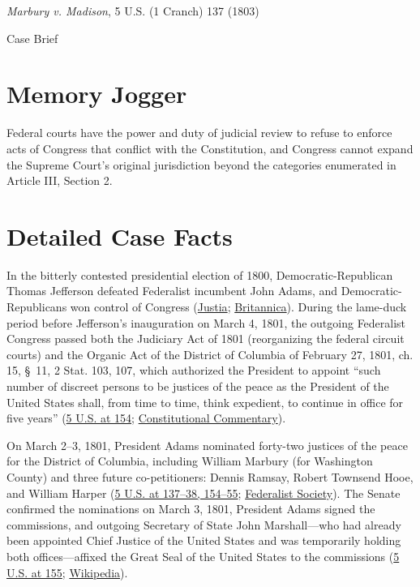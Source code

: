 \documentclass[12pt]{article}
\begin{document}
\begin{center}
{\LARGE \textit{Marbury v. Madison}, 5 U.S. (1 Cranch) 137 (1803)\par}
\vspace{0.8em}
{\large Case Brief\par}
\end{center}
\vspace{1em}

\section{Memory Jogger}

Federal courts have the power and duty of judicial review to refuse to enforce acts of Congress that conflict with the Constitution, and Congress cannot expand the Supreme Court's original jurisdiction beyond the categories enumerated in Article III, Section 2.

\section{Detailed Case Facts}

In the bitterly contested presidential election of 1800, Democratic-Republican Thomas Jefferson defeated Federalist incumbent John Adams, and Democratic-Republicans won control of Congress (\href{https://supreme.justia.com/cases/federal/us/5/137/}{Justia}; \href{https://www.britannica.com/event/Marbury-v-Madison}{Britannica}). During the lame-duck period before Jefferson's inauguration on March 4, 1801, the outgoing Federalist Congress passed both the Judiciary Act of 1801 (reorganizing the federal circuit courts) and the Organic Act of the District of Columbia of February 27, 1801, ch. 15, \S~11, 2 Stat. 103, 107, which authorized the President to appoint ``such number of discreet persons to be justices of the peace as the President of the United States shall, from time to time, think expedient, to continue in office for five years'' (\href{https://supreme.justia.com/cases/federal/us/5/137/}{5 U.S. at 154}; \href{https://scholarship.law.umn.edu/cgi/viewcontent.cgi?article=2064&context=concomm}{Constitutional Commentary}).

On March 2--3, 1801, President Adams nominated forty-two justices of the peace for the District of Columbia, including William Marbury (for Washington County) and three future co-petitioners: Dennis Ramsay, Robert Townsend Hooe, and William Harper (\href{https://supreme.justia.com/cases/federal/us/5/137/}{5 U.S. at 137--38, 154--55}; \href{https://fedsoc.org/case/marbury-v-madison}{Federalist Society}). The Senate confirmed the nominations on March 3, 1801, President Adams signed the commissions, and outgoing Secretary of State John Marshall---who had already been appointed Chief Justice of the United States and was temporarily holding both offices---affixed the Great Seal of the United States to the commissions (\href{https://supreme.justia.com/cases/federal/us/5/137/}{5 U.S. at 155}; \href{https://en.wikipedia.org/wiki/Marbury_v._Madison}{Wikipedia}).
\end{document}
